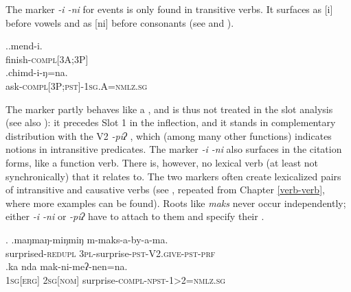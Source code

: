  The marker  \emph{-i \ti -ni} for  events is only found in transitive verbs. It surfaces as [i] before vowels and as [ni] before consonants (see \Next and \NNext). 
 
 \ex.\ag.mend-i.\\
 finish{\scshape -compl[3A;3P]}\\
 \bg.chimd-i-ŋ=na.\\
ask{\scshape -compl[3P;pst]-1sg.A=nmlz.sg}\\
 
The marker partly behaves like a , and is thus not treated in the slot analysis (see also ): it precedes Slot 1 in the inflection, and it stands in complementary distribution with the V2 \emph{-piʔ} , which (among many other functions) indicates  notions in intransitive  predicates. The marker \emph{-i \ti -ni} also surfaces in the citation forms, like a function verb. There is, however, no lexical verb (at least not synchronically) that it relates to. The two markers often create lexicalized pairs of intransitive and causative verbs (see \Next, repeated from Chapter \ref{verb-verb}, where more examples can be found). Roots like \emph{maks}  never occur independently; either \emph{-i \ti -ni} or \emph{-piʔ} have to attach to them and specify their . 

 
\ex. \ag.maŋmaŋ-miŋmiŋ m-maks-a-by-a-ma.\\
	surprised{\scshape -redupl} {\scshape 3pl-}surprise{\scshape -pst-V2.give-pst-prf}\\
	 
 	\bg.ka nda mak-ni-meʔ-nen=na.\\
	{\scshape 1sg[erg]} {\scshape 2sg[nom]} surprise{\scshape -compl-npst-1>2=nmlz.sg}		\\
	

 
 
 
 
